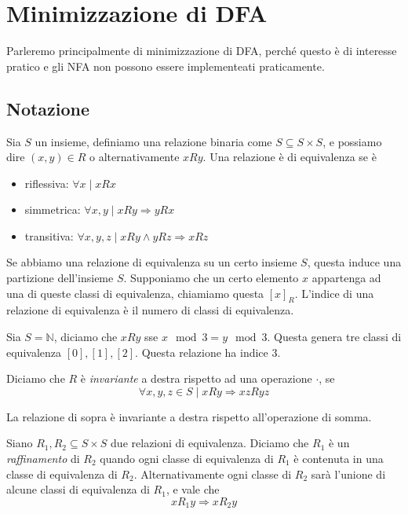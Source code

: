 \documentclass[12pt]{article}
\begin{document}
\tableofcontents
\newpage
\section{Minimizzazione di DFA}
Parleremo principalmente di minimizzazione di DFA, perché questo è di interesse pratico e gli NFA non possono essere implementeati praticamente.

\subsection{Notazione}
Sia $S$ un insieme, definiamo una relazione binaria come $S \subseteq S \times S$, e possiamo dire $(x, y) \in R$ o alternativamente $x R y$.
Una relazione è di equivalenza se è
\begin{itemize}
	\item riflessiva: $ \forall x \mid x R x $
	\item simmetrica: $ \forall x, y \mid x R y \Rightarrow y R x $
	\item transitiva: $\forall x, y, z \mid x R y \wedge y R z \Rightarrow x R z $
\end{itemize}
Se abbiamo una relazione di equivalenza su un certo insieme $S$, questa induce una partizione dell'insieme $S$.
Supponiamo che un certo elemento $x$ appartenga ad una di queste classi di equivalenza, chiamiamo questa $[x]_R$.
L'indice di una relazione di equivalenza è il numero di classi di equivalenza.

\begin{tcolorbox}
	Sia $S = \mathbb{N}$, diciamo che $x R y$ sse $x \mod 3 = y \mod 3$.
	Questa genera tre classi di equivalenza $[0], [1], [2]$.
	Questa relazione ha indice 3.
\end{tcolorbox}

Diciamo che $R$ è \textit{invariante} a destra rispetto ad una operazione $\cdot$, se
$$ \forall x, y, z \in S \mid x R y \Rightarrow x z R y z $$

\begin{tcolorbox}
	La relazione di sopra è invariante a destra rispetto all'operazione di somma.
\end{tcolorbox}

Siano $R_1, R_2 \subseteq S \times S$ due relazioni di equivalenza.
Diciamo che $R_1$ è un \textit{raffinamento} di $R_2$ quando ogni classe di equivalenza di $R_1$ è contenuta in una classe di equivalenza di $R_2$.
Alternativamente ogni classe di $R_2$ sarà l'unione di alcune classi di equivalenza di $R_1$, e vale che
$$ x R_1 y \Rightarrow x R_2 y $$
\end{document}
